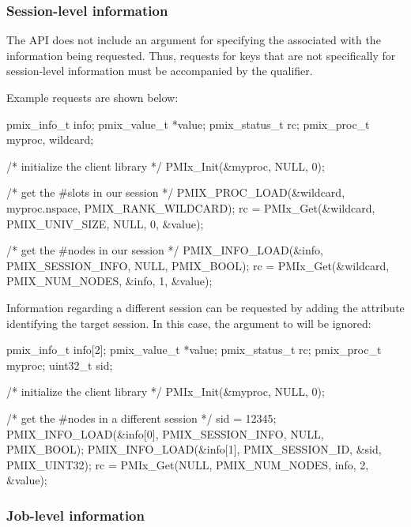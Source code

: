 \subsubsection{Session-level information}

The  \ac{API} does not include an argument for specifying the  associated with the information being requested. Thus, requests for keys that are not specifically for session-level information must be accompanied by the  qualifier.

Example requests are shown below:

\cspecificstart
\begin{codepar}
pmix_info_t info;
pmix_value_t *value;
pmix_status_t rc;
pmix_proc_t myproc, wildcard;

/* initialize the client library */
PMIx_Init(&myproc, NULL, 0);

/* get the #slots in our session */
PMIX_PROC_LOAD(&wildcard, myproc.nspace, PMIX_RANK_WILDCARD);
rc = PMIx_Get(&wildcard, PMIX_UNIV_SIZE, NULL, 0, &value);

/* get the #nodes in our session */
PMIX_INFO_LOAD(&info, PMIX_SESSION_INFO, NULL, PMIX_BOOL);
rc = PMIx_Get(&wildcard, PMIX_NUM_NODES, &info, 1, &value);
\end{codepar}
\cspecificend

Information regarding a different session can be requested by adding the  attribute identifying the target session. In this case, the  argument to  will be ignored:

\cspecificstart
\begin{codepar}
pmix_info_t info[2];
pmix_value_t *value;
pmix_status_t rc;
pmix_proc_t myproc;
uint32_t sid;

/* initialize the client library */
PMIx_Init(&myproc, NULL, 0);

/* get the #nodes in a different session */
sid = 12345;
PMIX_INFO_LOAD(&info[0], PMIX_SESSION_INFO, NULL, PMIX_BOOL);
PMIX_INFO_LOAD(&info[1], PMIX_SESSION_ID, &sid, PMIX_UINT32);
rc = PMIx_Get(NULL, PMIX_NUM_NODES, info, 2, &value);
\end{codepar}
\cspecificend


\subsubsection{Job-level information}

